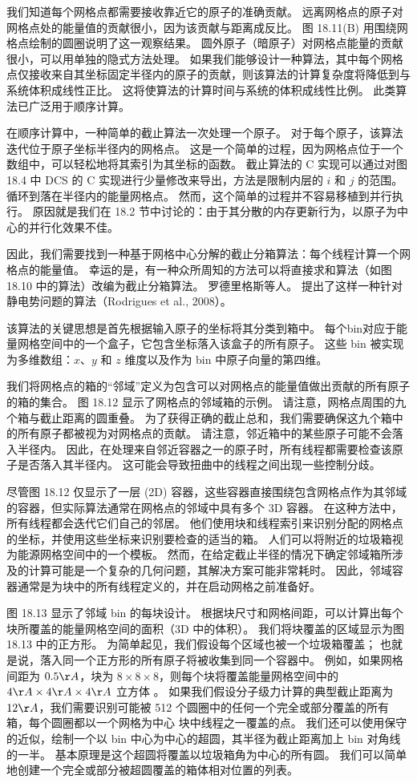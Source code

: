我们知道每个网格点都需要接收靠近它的原子的准确贡献。 远离网格点的原子对网格点处的能量值的贡献很小，因为该贡献与距离成反比。 图 18.11(B) 用围绕网格点绘制的圆圈说明了这一观察结果。 圆外原子（暗原子）对网格点能量的贡献很小，可以用单独的隐式方法处理。 如果我们能够设计一种算法，其中每个网格点仅接收来自其坐标固定半径内的原子的贡献，则该算法的计算复杂度将降低到与系统体积成线性正比。 这将使算法的计算时间与系统的体积成线性比例。 此类算法已广泛用于顺序计算。

在顺序计算中，一种简单的截止算法一次处理一个原子。 对于每个原子，该算法迭代位于原子坐标半径内的网格点。 这是一个简单的过程，因为网格点位于一个数组中，可以轻松地将其索引为其坐标的函数。 截止算法的 $\mathrm{C}$ 实现可以通过对图 18.4 中 DCS 的 $\mathrm{C}$ 实现进行少量修改来导出，方法是限制内层的 $i$ 和 $j$ 的范围。 循环到落在半径内的能量网格点。 然而，这个简单的过程并不容易移植到并行执行。 原因就是我们在 18.2 节中讨论的：由于其分散的内存更新行为，以原子为中心的并行化效果不佳。

因此，我们需要找到一种基于网格中心分解的截止分箱算法：每个线程计算一个网格点的能量值。 幸运的是，有一种众所周知的方法可以将直接求和算法（如图 18.10 中的算法）改编为截止分箱算法。 罗德里格斯等人。 提出了这样一种针对静电势问题的算法（Rodrigues et al., 2008）。

该算法的关键思想是首先根据输入原子的坐标将其分类到箱中。 每个bin对应于能量网格空间中的一个盒子，它包含坐标落入该盒子的所有原子。 这些 bin 被实现为多维数组：$x、y$ 和 $z$ 维度以及作为 bin 中原子向量的第四维。

我们将网格点的箱的“邻域”定义为包含可以对网格点的能量值做出贡献的所有原子的箱的集合。 图 18.12 显示了网格点的邻域箱的示例。 请注意，网格点周围的九个箱与截止距离的圆重叠。 为了获得正确的截止总和，我们需要确保这九个箱中的所有原子都被视为对网格点的贡献。 请注意，邻近箱中的某些原子可能不会落入半径内。 因此，在处理来自邻近容器之一的原子时，所有线程都需要检查该原子是否落入其半径内。 这可能会导致扭曲中的线程之间出现一些控制分歧。

尽管图 18.12 仅显示了一层 (2D) 容器，这些容器直接围绕包含网格点作为其邻域的容器，但实际算法通常在网格点的邻域中具有多个 3D 容器。 在这种方法中，所有线程都会迭代它们自己的邻居。 他们使用块和线程索引来识别分配的网格点的坐标，并使用这些坐标来识别要检查的适当的箱。 人们可以将附近的垃圾箱视为能源网格空间中的一个模板。 然而，在给定截止半径的情况下确定邻域箱所涉及的计算可能是一个复杂的几何问题，其解决方案可能非常耗时。 因此，邻域容器通常是为块中的所有线程定义的，并在启动网格之前准备好。

图 18.13 显示了邻域 bin 的每块设计。 根据块尺寸和网格间距，可以计算出每个块所覆盖的能量网格空间的面积（3D 中的体积）。 我们将块覆盖的区域显示为图 18.13 中的正方形。 为简单起见，我们假设每个区域也被一个垃圾箱覆盖； 也就是说，落入同一个正方形的所有原子将被收集到同一个容器中。 例如，如果网格间距为 $0.5 \AA$，块为 $8 \times 8 \times 8$，则每个块将覆盖能量网格空间中的 $4 \AA \times 4 \AA \times 4 \AA$ 立方体 。 如果我们假设分子级力计算的典型截止距离为 $12 \AA$，我们需要识别可能被 512 个圆圈中的任何一个完全或部分覆盖的所有箱，每个圆圈都以一个网格为中心 块中线程之一覆盖的点。 我们还可以使用保守的近似，绘制一个以 bin 中心为中心的超圆，其半径为截止距离加上 bin 对角线的一半。 基本原理是这个超圆将覆盖以垃圾箱角为中心的所有圆。 我们可以简单地创建一个完全或部分被超圆覆盖的箱体相对位置的列表。

